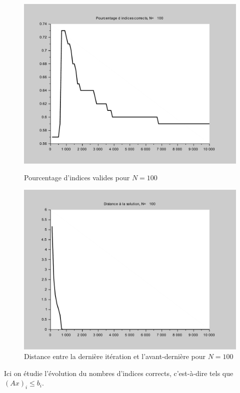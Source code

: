 \documentclass[10pt,a4paper]{article}
\begin{document}
\begin{figure}[H]
\centering
\begin{minipage}[b]{.46\linewidth}
\centering
\includegraphics[scale=0.3]{percent_alpha2_100.pdf}
\caption{Pourcentage d'indices valides pour $N=100$}
\end{minipage}
\begin{minipage}[b]{.46\linewidth}
\centering
\includegraphics[scale=0.3]{dist_alpha2_100.pdf}
\caption{Distance entre la dernière itération et l'avant-dernière pour $N=100$}
\end{minipage}
\end{figure}
Ici on étudie l'évolution du nombres d'indices corrects, c'est-à-dire tels que $(Ax)_i \le b_i$.
\end{document}
